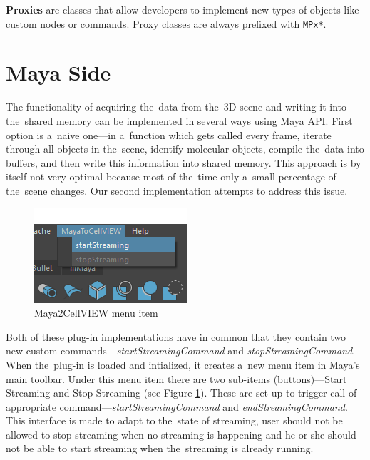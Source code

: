 \documentclass[
  digital, %
  table,   %
  nolof,     %
  nolot,     %
  oneside,
]{fithesis3}
\begin{document}
\textbf{Proxies} are classes that allow developers to implement new types of objects like custom nodes or commands. Proxy classes are always prefixed with \texttt{MPx*}.

\section{Maya Side}
The functionality of acquiring the data from the 3D scene and writing it into the shared memory can be implemented in several ways using Maya API.
First option is a naive one—in a function which gets called every frame, iterate through all objects in the scene, identify molecular objects, compile the data into buffers, and then write this information into shared memory.
This approach is by itself not very optimal because most of the time only a small percentage of the scene changes. Our second implementation attempts to address this issue.

\begin{figure}
  \centering
  \includegraphics{images/maya-to-unity-menu.png}
  \caption{Maya2CellVIEW menu item}
  \label{fig:maya-menu-item}
\end{figure}

Both of these plug-in implementations have in common that they contain two new custom commands—\textit{startStreamingCommand} and \textit{stopStreamingCommand}. When the plug-in is loaded and intialized, it creates a new menu item in Maya's main toolbar. Under this menu item there are two sub-items (buttons)—Start Streaming and Stop Streaming (see Figure \ref{fig:maya-menu-item}). These are set up to trigger call of appropriate command—\textit{startStreamingCommand} and \textit{endStreamingCommand}. This interface is made to adapt to the state of streaming, user should not be allowed to stop streaming when no streaming is happening and he or she should not be able to start streaming when the streaming is already running.
\end{document}
